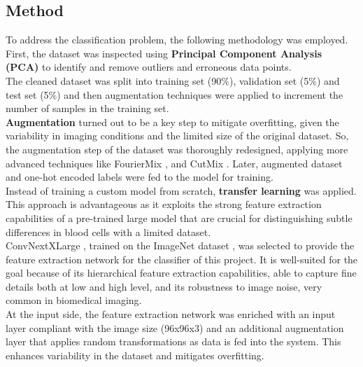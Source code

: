 \documentclass[11pt]{article}
\begin{document}
\begin{multicols}{2}
        \section{Method}
        \label{sec:method}
        
        To address the classification problem, the following methodology was employed. First, the dataset was inspected using \textbf{Principal Component Analysis (PCA)}  \cite{jolliffe2016principal} to identify and remove outliers and erroneous data points.\\ 
        The cleaned dataset was split into training set (90\%), validation set (5\%) and test set (5\%) and then augmentation techniques were applied to increment the number of samples in the training set. \\
        \textbf{Augmentation} turned out to be a key step to mitigate overfitting, given the variability in imaging conditions and the limited size of the original dataset. 
        So, the augmentation step of the dataset was thoroughly redesigned, applying more advanced techniques like FourierMix \cite{fouriermix}, and CutMix \cite{cutmix}.
        Later, augmented dataset and one-hot encoded labels were fed to the model for training. \\
        Instead of training a custom model from scratch, \textbf{transfer learning} was applied.
        This approach is advantageous as it exploits the strong feature extraction capabilities of a pre-trained large model that are crucial for distinguishing subtle differences in blood cells with a limited dataset.\\
        ConvNextXLarge \cite{liu2022convnext}, trained on the ImageNet dataset \cite{deng2009imagenet}, was selected to provide the feature extraction network for the classifier of this project. It is well-suited for the goal because of its hierarchical feature extraction capabilities, able to capture fine details both at low and high level, and its robustness to image noise, very common in biomedical imaging. \\
        At the input side, the feature extraction network was enriched with an input layer compliant with the image size (96x96x3) and an additional augmentation layer that applies random transformations as data is fed into the system. This enhances variability in the dataset and mitigates overfitting. \\

\end{multicols}
\end{document}
